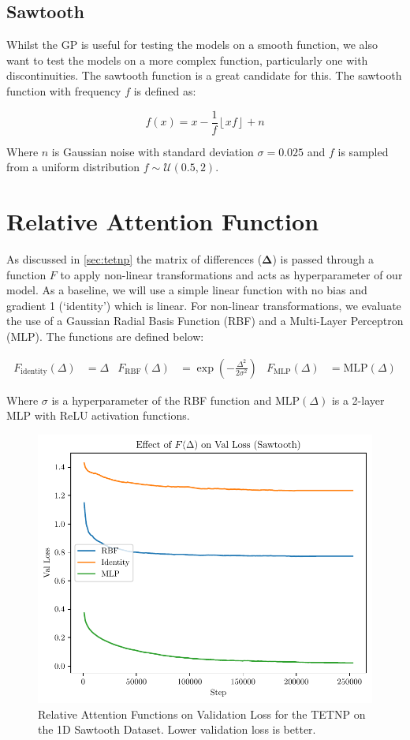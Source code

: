 \documentclass[../../main.tex]{subfiles}
\begin{document}
\subsection{Sawtooth}
\label{sec:1d-sawtooth-dataset}

Whilst the GP is useful for testing the models on a smooth function, we also want to test the models on a more complex function, particularly one with discontinuities. The sawtooth function is a great candidate for this. The sawtooth function with frequency $f$ is defined as:

\begin{equation}
	f(x) = x - \frac{1}{f} \left\lfloor xf \right\rfloor + n
\end{equation}

Where $n$ is Gaussian noise with standard deviation $\sigma = 0.025$ and $f$ is sampled from a uniform distribution $f \sim \mathcal{U}(0.5, 2)$.


\section{Relative Attention Function}

As discussed in \autoref{sec:tetnp} the matrix of differences ($\bm{\Delta}$) is passed through a function $F$ to apply non-linear transformations and acts as hyperparameter of our model. As a baseline, we will use a simple linear function with no bias and gradient 1 (`identity') which is linear. For non-linear transformations, we evaluate the use of a Gaussian Radial Basis Function (RBF) and a Multi-Layer Perceptron (MLP). The functions are defined below:

\begin{align}
	F_{\text{identity}}(\Delta) &= \Delta&
	F_{\text{RBF}}(\Delta) &= \exp\left(-\frac{\Delta^2}{2\sigma^2}\right)&
	F_{\text{MLP}}(\Delta) &= \text{MLP}(\Delta)
\end{align}

Where $\sigma$ is a hyperparameter of the RBF function and $\text{MLP}(\Delta)$ is a 2-layer MLP with ReLU \parencite{agarap2019deep} activation functions.

\begin{figure}[H]
	\centering
	\includegraphics[width=0.6\linewidth]{./F-on-loss.pdf}
	\caption{Relative Attention Functions on Validation Loss for the TETNP on the 1D Sawtooth Dataset. Lower validation loss is better.}
	\label{fig:relative-attn-func-1d}
\end{figure}
\end{document}
